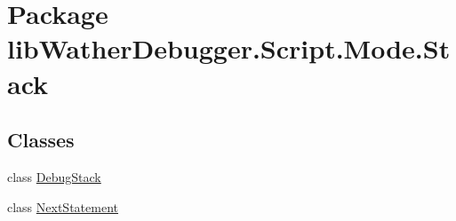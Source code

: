 \hypertarget{namespacelib_wather_debugger_1_1_script_1_1_mode_1_1_stack}{\section{Package lib\+Wather\+Debugger.\+Script.\+Mode.\+Stack}
\label{namespacelib_wather_debugger_1_1_script_1_1_mode_1_1_stack}
}
\subsection*{Classes}
\begin{DoxyCompactItemize}
\item 
class \hyperlink{classlib_wather_debugger_1_1_script_1_1_mode_1_1_stack_1_1_debug_stack}{Debug\+Stack}
\item 
class \hyperlink{classlib_wather_debugger_1_1_script_1_1_mode_1_1_stack_1_1_next_statement}{Next\+Statement}
\end{DoxyCompactItemize}
